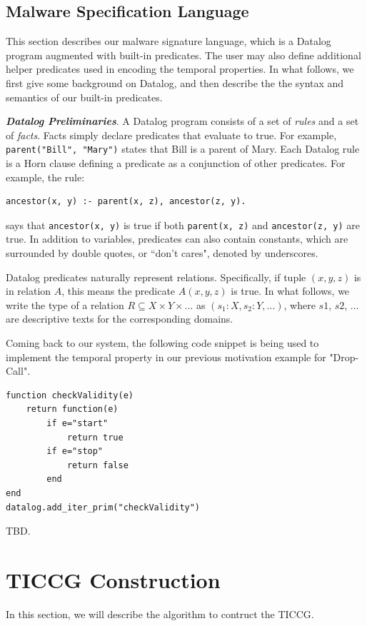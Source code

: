 \documentclass{article}
\begin{document}
\subsection{Malware Specification Language}
This section describes our malware signature language, which is a Datalog program augmented with 
built-in predicates. The user may also define 
additional helper predicates  used in encoding the temporal properties.
In what follows, we first give some background on Datalog, and then describe the 
 the syntax and semantics of our built-in predicates.


{\bf \emph{Datalog Preliminaries}}. 
A Datalog program  consists of a set of \emph{rules} and a set of \emph{facts}. 
Facts simply declare predicates that evaluate to true. For example, 
{\tt parent("Bill", "Mary")} states that Bill is a parent of Mary. Each  Datalog rule is  a Horn clause defining a predicate as a conjunction of other
predicates. For example, the  rule:

\begin{verbatim}
ancestor(x, y) :- parent(x, z), ancestor(z, y).
\end{verbatim}
\normalsize

\noindent
says that \verb+ancestor(x, y)+ is true if both \verb+parent(x, z)+ and
\verb+ancestor(z, y)+ are true. In addition to variables, predicates can 
also contain constants, 
which are surrounded by double quotes, or
``don't cares",  denoted by underscores.

Datalog predicates naturally represent relations. Specifically, if tuple $(x, y, z)$
is in relation $A$, this means the  predicate $A(x, y, z)$ is
true. In what follows, we write the type of a relation $R \subseteq X \times Y \times \ldots$ as $(s_1 : X, s_2 : Y, \ldots)$, where
$s1$, $s2$, $\ldots$ are descriptive texts for the corresponding domains.

Coming back to our system, the following code snippet is being used to implement the temporal
property in our previous motivation example for "Drop-Call".

\begin{verbatim}
function checkValidity(e)
    return function(e)
        if e="start"
            return true
        if e="stop"
            return false
        end
end
datalog.add_iter_prim("checkValidity")
\end{verbatim}
\normalsize

TBD.


\section{TICCG Construction}
\label{sec:construct}
In this section, we will describe the algorithm to contruct the TICCG. 
\end{document}
